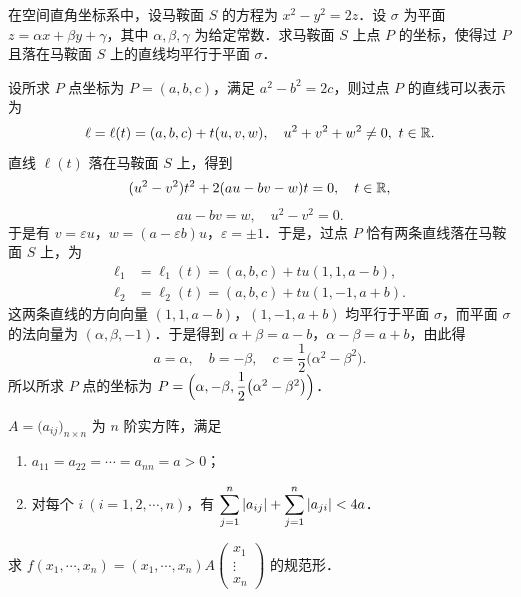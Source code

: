 
在空间直角坐标系中，设马鞍面 $S$ 的方程为 $x^{2}-y^{2}=2z$．设 $\sigma$ 为平面 $z=\alpha x+\beta y+\gamma$，其中 $\alpha,\beta,\gamma$ 为给定常数．求马鞍面 $S$ 上点 $P$ 的坐标，使得过 $P$ 且落在马鞍面 $S$ 上的直线均平行于平面 $\sigma$．

\begin{solution}
设所求 $P$ 点坐标为 $P=(a,b,c)$，满足 $a^{2}-b^{2}=2c$，则过点 $P$ 的直线可以表示为
\[
  \ell=\ell(t)=(a,b,c)+t(u,v,w),\quad u^{2}+v^{2}+w^{2}\ne 0,\ t\in\mathbb{R}.
\]
直线 $\ell(t)$ 落在马鞍面 $S$ 上，得到
\[
  (u^{2}-v^{2})t^{2}+2(au-bv-w)t=0,\quad t\in\mathbb{R},
\]
\[
  au-bv=w,\quad u^{2}-v^{2}=0.
\]
于是有 $v=\varepsilon u$，$w=(a-\varepsilon b)u$，$\varepsilon=\pm 1$．于是，过点 $P$ 恰有两条直线落在马鞍面 $S$ 上，为
\begin{align*}
  \ell_{1}&=\ell_{1}(t)=(a,b,c)+tu(1,1,a-b),\\
  \ell_{2}&=\ell_{2}(t)=(a,b,c)+tu(1,-1,a+b).
\end{align*}
这两条直线的方向向量 $(1,1,a-b)$，$(1,-1,a+b)$ 均平行于平面 $\sigma$，而平面 $\sigma$ 的法向量为 $(\alpha,\beta,-1)$．于是得到 $\alpha+\beta=a-b$，$\alpha-\beta=a+b$，由此得
\[
  a=\alpha,\quad b=-\beta,\quad c=\frac{1}{2}\bigl(\alpha^{2}-\beta^{2}\bigr).
\]
所以所求 $P$ 点的坐标为 $P=\Bigl(\alpha,-\beta,\dfrac{1}{2}\bigl(\alpha^{2}-\beta^{2}\bigr)\Bigr)$．
\end{solution}

$A=\bigl(a_{ij}\bigr)_{n\times n}$ 为 $n$ 阶实方阵，满足
\begin{enumerate}
  \item $a_{11}=a_{22}=\cdots=a_{nn}=a>0$；
  \item 对每个 $i\ (i=1,2,\cdots,n)$，有 $\displaystyle\sum_{j=1}^{n}\left|a_{ij}\right|+\sum_{j=1}^{n}\left|a_{ji}\right|<4a$．
\end{enumerate}
求 $f(x_{1},\cdots,x_{n})=(x_{1},\cdots,x_{n})A\begin{pmatrix}x_{1}\\ \vdots\\ x_{n}\end{pmatrix}$ 的规范形．

